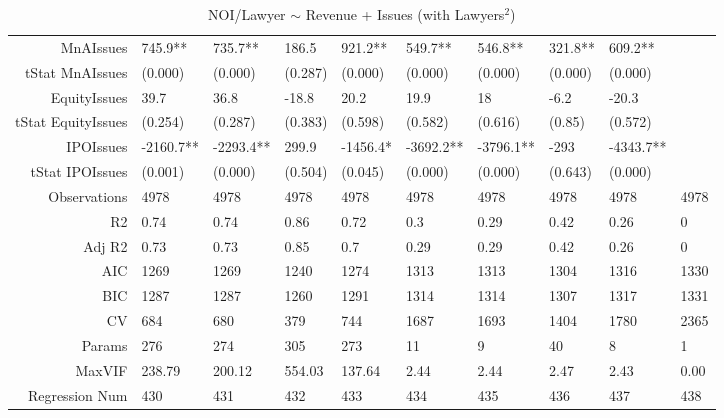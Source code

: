 \begin{table}[ht]
\begin{tabular}{rlllllllll}
  MnAIssues & 745.9** & 735.7** & 186.5 & 921.2** & 549.7** & 546.8** & 321.8** & 609.2** &  \\ 
  tStat MnAIssues & (0.000) & (0.000) & (0.287) & (0.000) & (0.000) & (0.000) & (0.000) & (0.000) &  \\ 
  EquityIssues & 39.7 & 36.8 & -18.8 & 20.2 & 19.9 & 18 & -6.2 & -20.3 &  \\ 
  tStat EquityIssues & (0.254) & (0.287) & (0.383) & (0.598) & (0.582) & (0.616) & (0.85) & (0.572) &  \\ 
  IPOIssues & -2160.7** & -2293.4** & 299.9 & -1456.4* & -3692.2** & -3796.1** & -293 & -4343.7** &  \\ 
  tStat IPOIssues & (0.001) & (0.000) & (0.504) & (0.045) & (0.000) & (0.000) & (0.643) & (0.000) &  \\ 
  Observations & 4978 & 4978 & 4978 & 4978 & 4978 & 4978 & 4978 & 4978 & 4978 \\ 
  R2 & 0.74 & 0.74 & 0.86 & 0.72 & 0.3 & 0.29 & 0.42 & 0.26 & 0 \\ 
  Adj R2 & 0.73 & 0.73 & 0.85 & 0.7 & 0.29 & 0.29 & 0.42 & 0.26 & 0 \\ 
  AIC & 1269 & 1269 & 1240 & 1274 & 1313 & 1313 & 1304 & 1316 & 1330 \\ 
  BIC & 1287 & 1287 & 1260 & 1291 & 1314 & 1314 & 1307 & 1317 & 1331 \\ 
  CV & 684 & 680 & 379 & 744 & 1687 & 1693 & 1404 & 1780 & 2365 \\ 
  Params & 276 & 274 & 305 & 273 & 11 & 9 & 40 & 8 & 1 \\ 
  MaxVIF & 238.79 & 200.12 & 554.03 & 137.64 & 2.44 & 2.44 & 2.47 & 2.43 & 0.00 \\ 
  Regression Num & 430 & 431 & 432 & 433 & 434 & 435 & 436 & 437 & 438 \\ 
   \hline
\end{tabular}
\caption{NOI/Lawyer $\sim$ Revenue + Issues (with Lawyers$^2$)} 
\end{table}
